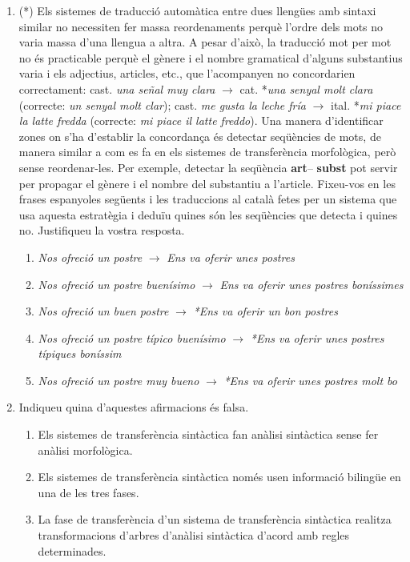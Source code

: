 \begin{enumerate}
\item (*) \label{ex:postres} Els sistemes de traducció automàtica
  entre dues llengües amb sintaxi similar no necessiten fer massa
  reordenaments perquè l'ordre dels mots no varia massa d'una llengua
  a altra. A pesar d'això, la traducció mot per mot no és practicable
  perquè el gènere i el nombre gramatical d'alguns substantius varia i
  els adjectius, articles, etc., que l'acompanyen no concordarien
  correctament: cast. {\em una señal muy clara\/} $\rightarrow$
  cat. *{\em una senyal molt clara} (correcte: {\em un senyal molt
    clar\/}); cast. {\em me gusta la leche fría} $\rightarrow$
  ital. *{\em mi piace la latte fredda\/} (correcte: {\em mi piace il
    latte freddo}). Una manera d'identificar zones on s'ha d'establir
  la concordança és detectar seqüències de mots, de manera similar a
  com es fa en els sistemes de transferència morfològica, però sense
  reordenar-les. Per exemple, detectar la seqüència {\bf art}--{\bf
    subst} pot servir per propagar el gènere i el nombre del
  substantiu a l'article. Fixeu-vos en les frases espanyoles següents
  i les traduccions al català fetes per un sistema que usa aquesta
  estratègia i deduïu quines són les seqüències que detecta i quines
  no. Justifiqueu la vostra resposta.
  \begin{enumerate}
  \item \emph{Nos ofreció un postre} $\rightarrow$ \emph{Ens va oferir
      unes postres\/}
  \item \emph{Nos ofreció un postre buenísimo} $\rightarrow$ \emph{Ens
      va oferir unes postres boníssimes\/}
  \item \emph{Nos ofreció un buen postre} $\rightarrow$ \emph{*Ens va
      oferir un bon postres\/}
  \item \emph{Nos ofreció un postre típico buenísimo\/} $\rightarrow$
    \emph{*Ens va oferir unes postres típiques boníssim\/}
  \item \emph{Nos ofreció un postre muy bueno} $\rightarrow$ \emph{*Ens
      va oferir unes postres molt bo\/}
  \end{enumerate}

\item Indiqueu quina d'aquestes afirmacions és falsa.   
  \begin{enumerate}
  \item Els sistemes de transferència sintàctica fan anàlisi
    sintàctica sense fer anàlisi morfològica.
  \item Els sistemes de transferència sintàctica només usen informació
    bilingüe en una de les tres fases.
  \item La fase de transferència d'un sistema de transferència
    sintàctica realitza transformacions d'arbres d'anàlisi sintàctica
    d'acord amb regles determinades.
  \end{enumerate}


\end{enumerate}
